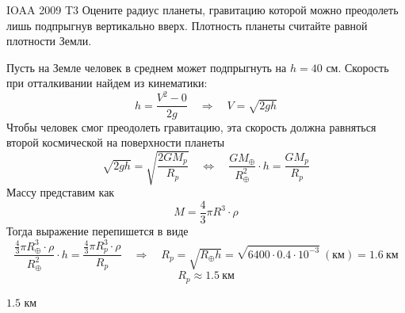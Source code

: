 \begin{problem}{IOAA 2009 T3} 
	Оцените радиус планеты, гравитацию которой можно преодолеть лишь подпрыгнув вертикально вверх. Плотность планеты считайте равной плотности Земли.

\begin{solution}
	Пусть на Земле человек в среднем может подпрыгнуть на $h=40$ см. Скорость при отталкивании найдем из кинематики:
\begin{equation}
    h=\frac{V^2-0}{2g} \quad\Longrightarrow\quad V=\sqrt{2gh}
\end{equation}
Чтобы человек смог преодолеть гравитацию, эта скорость должна равняться второй космической на поверхности планеты
\begin{equation}
    \sqrt{2gh}=\sqrt{\frac{2GM_p}{R_p}} \quad\Longleftrightarrow\quad \frac{GM_{\oplus}}{R^2_{\oplus}}\cdot h=\frac{GM_p}{R_p}
\end{equation}
Массу представим как
\begin{equation}
    M=\frac{4}{3}\pi R^3\cdot\rho
\end{equation}
Тогда выражение перепишется в виде
\begin{equation}
    \frac{\frac{4}{3}\pi R^3_{\oplus}\cdot\rho}{R^2_{\oplus}}\cdot h=\frac{\frac{4}{3}\pi R^3_p\cdot\rho}{R_p} \quad\Longrightarrow\quad R_p=\sqrt{R_{\oplus}h}=\sqrt{6400\cdot 0.4\cdot 10^{-3}}~(\text{км})=1.6~\text{км}
\end{equation}
\begin{equation}
    R_p\approx 1.5~\text{км}
\end{equation}
\end{solution}

\begin{answer}
	$1.5$ км
\end{answer}
\end{problem}